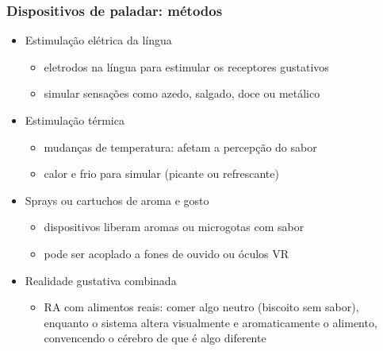 \documentclass{beamer}
\begin{document}
\begin{frame}
  \frametitle{Dispositivos de paladar: métodos}
  \begin{itemize}
    \item Estimulação elétrica da língua
    \begin{itemize}
      \item eletrodos na língua para estimular os receptores gustativos
      \item simular sensações como azedo, salgado, doce ou metálico
    \end{itemize}
    \item Estimulação térmica
    \begin{itemize}
      \item mudanças de temperatura: afetam a percepção do sabor
      \item calor e frio para simular (picante ou refrescante)  
    \end{itemize}
    \item Sprays ou cartuchos de aroma e gosto
    \begin{itemize}
      \item dispositivos liberam aromas ou microgotas com sabor
      \item pode ser acoplado a fones de ouvido ou óculos VR
    \end{itemize}
    \item Realidade gustativa combinada
    \begin{itemize}
      \item RA com alimentos reais: comer algo neutro (biscoito sem sabor), enquanto o sistema altera visualmente e aromaticamente o alimento, convencendo o cérebro de que é algo diferente
    \end{itemize}
  \end{itemize}
\end{frame}
\end{document}

